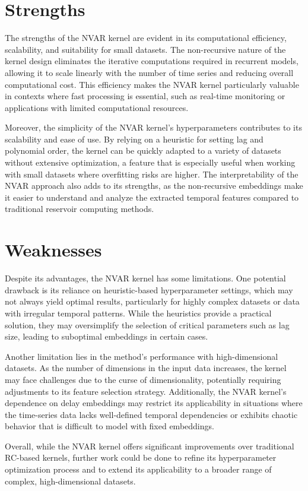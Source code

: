 \section{Strengths}

The strengths of the NVAR kernel are evident in its computational efficiency, scalability, and suitability for small datasets. The non-recursive nature of the kernel design eliminates the iterative computations required in recurrent models, allowing it to scale linearly with the number of time series and reducing overall computational cost. This efficiency makes the NVAR kernel particularly valuable in contexts where fast processing is essential, such as real-time monitoring or applications with limited computational resources.

Moreover, the simplicity of the NVAR kernel’s hyperparameters contributes to its scalability and ease of use. By relying on a heuristic for setting lag and polynomial order, the kernel can be quickly adapted to a variety of datasets without extensive optimization, a feature that is especially useful when working with small datasets where overfitting risks are higher. The interpretability of the NVAR approach also adds to its strengths, as the non-recursive embeddings make it easier to understand and analyze the extracted temporal features compared to traditional reservoir computing methods.

\section{Weaknesses}

Despite its advantages, the NVAR kernel has some limitations. One potential drawback is its reliance on heuristic-based hyperparameter settings, which may not always yield optimal results, particularly for highly complex datasets or data with irregular temporal patterns. While the heuristics provide a practical solution, they may oversimplify the selection of critical parameters such as lag size, leading to suboptimal embeddings in certain cases.

Another limitation lies in the method’s performance with high-dimensional datasets. As the number of dimensions in the input data increases, the kernel may face challenges due to the curse of dimensionality, potentially requiring adjustments to its feature selection strategy. Additionally, the NVAR kernel’s dependence on delay embeddings may restrict its applicability in situations where the time-series data lacks well-defined temporal dependencies or exhibits chaotic behavior that is difficult to model with fixed embeddings.

Overall, while the NVAR kernel offers significant improvements over traditional RC-based kernels, further work could be done to refine its hyperparameter optimization process and to extend its applicability to a broader range of complex, high-dimensional datasets.
